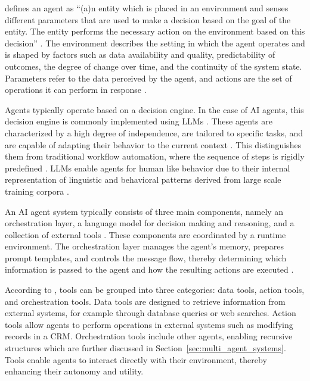 \documentclass[a4paper,oneside,bibliography=totoc]{scrbook}
\begin{document}
\citet{Dorri2018} defines an agent as \enquote{(a)n entity which is placed in an environment and senses different parameters that are used to make a decision based on the goal of the entity. The entity performs the necessary action on the environment based on this decision} \cite[S. 28574]{Dorri2018}. The environment describes the setting in which the agent operates and is shaped by factors such as data availability and quality, predictability of outcomes, the degree of change over time, and the continuity of the system state. Parameters refer to the data perceived by the agent, and actions are the set of operations it can perform in response \cite{Dorri2018}.

Agents typically operate based on a decision engine. In the case of \ac{AI} agents, this decision engine is commonly implemented using \acp{LLM} \cite{Sapkota2025,Park2023}. These agents are characterized by a high degree of independence, are tailored to specific tasks, and are capable of adapting their behavior to the current context \cite{Sapkota2025,OpenAI2025}. This distinguishes them from traditional workflow automation, where the sequence of steps is rigidly predefined \cite{Anthropic2024}. \acp{LLM} enable agents for human like behavior due to their internal representation of linguistic and behavioral patterns derived from large scale training corpora \cite{Park2023}.

An \ac{AI} agent system typically consists of three main components, namely an orchestration layer, a language model for decision making and reasoning, and a collection of external tools \cite{Wiesinger2025,OpenAI2025}. These components are coordinated by a runtime environment. The orchestration layer manages the agent’s memory, prepares prompt templates, and controls the message flow, thereby determining which information is passed to the agent and how the resulting actions are executed \cite{Wiesinger2025}.

According to \citet{OpenAI2025}, tools can be grouped into three categories: data tools, action tools, and orchestration tools. Data tools are designed to retrieve information from external systems, for example through database queries or web searches. Action tools allow agents to perform operations in external systems such as modifying records in a \ac{CRM}. Orchestration tools include other agents, enabling recursive structures which are further discussed in Section~\ref{sec:multi_agent_systems}. Tools enable agents to interact directly with their environment, thereby enhancing their autonomy and utility.
\end{document}
